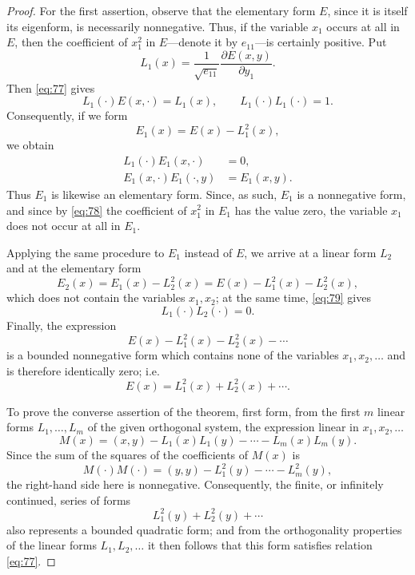 \documentclass[b5paper,twoside]{article}
\newcommand{\originalpage}[1]{\phantomsection\label{origpage:#1}}
\begin{document}
\begin{proof}
For the first assertion, observe that the elementary form $E$, since it is
itself its eigenform, is necessarily nonnegative.  Thus, if the variable
$x_1$ occurs at all in $E$, then the coefficient of $x_1^2$ in $E$---denote
it by $e_{11}$---is certainly positive.  Put
\[
  L_1(x)=\frac{1}{\sqrt{e_{11}}}
  \frac{\partial E(x,y)}{\partial y_1}.
\]
Then \eqref{eq:77} gives
\[
  L_1(\mathord{\cdot})E(x,\mathord{\cdot})=L_1(x),
  \qquad
  L_1(\mathord{\cdot})L_1(\mathord{\cdot})=1.
\]
Consequently, if we form
\begin{equation}
\tag{78}\label{eq:78}
  E_1(x)=E(x)-L_1^2(x),
\end{equation}
\originalpage{195}we obtain
\begin{equation}
\tag{79}\label{eq:79}
\begin{aligned}
  L_1(\mathord{\cdot})E_1(x,\mathord{\cdot})&=0,\\
  E_1(x,\mathord{\cdot})E_1(\mathord{\cdot},y)&=E_1(x,y).
\end{aligned}
\end{equation}
Thus $E_1$ is likewise an elementary form.  Since, as such, $E_1$ is a
nonnegative form, and since by \eqref{eq:78} the coefficient of $x_1^2$ in
$E_1$ has the value zero, the variable $x_1$ does not occur at all in $E_1$.

Applying the same procedure to $E_1$ instead of $E$, we arrive at a linear
form $L_2$ and at the elementary form
\[
  E_2(x)=E_1(x)-L_2^2(x)=E(x)-L_1^2(x)-L_2^2(x),
\]
which does not contain the variables $x_1,x_2$; at the same time,
\eqref{eq:79} gives
\[
  L_1(\mathord{\cdot})L_2(\mathord{\cdot})=0.
\]
Finally, the expression
\[
  E(x)-L_1^2(x)-L_2^2(x)-\cdots
\]
is a bounded nonnegative form which contains none of the variables
$x_1,x_2,\ldots$ and is therefore identically zero; i.e.
\[
  E(x)=L_1^2(x)+L_2^2(x)+\cdots.
\]

To prove the converse assertion of the theorem, first form, from the first
$m$ linear forms $L_1,\ldots,L_m$ of the given orthogonal system, the
expression linear in $x_1,x_2,\ldots$
\[
  M(x)=(x,y)-L_1(x)L_1(y)-\cdots-L_m(x)L_m(y).
\]
Since the sum of the squares of the coefficients of $M(x)$ is
\[
  M(\mathord{\cdot})M(\mathord{\cdot})
  =(y,y)-L_1^2(y)-\cdots-L_m^2(y),
\]
the right-hand side here is nonnegative.  Consequently, the finite, or
infinitely continued, series of forms
\[
  L_1^2(y)+L_2^2(y)+\cdots
\]
also represents a bounded quadratic form; and from the orthogonality
properties of the linear forms $L_1,L_2,\ldots$ it then follows that this
form satisfies relation \eqref{eq:77}.
\end{proof}
\end{document}
